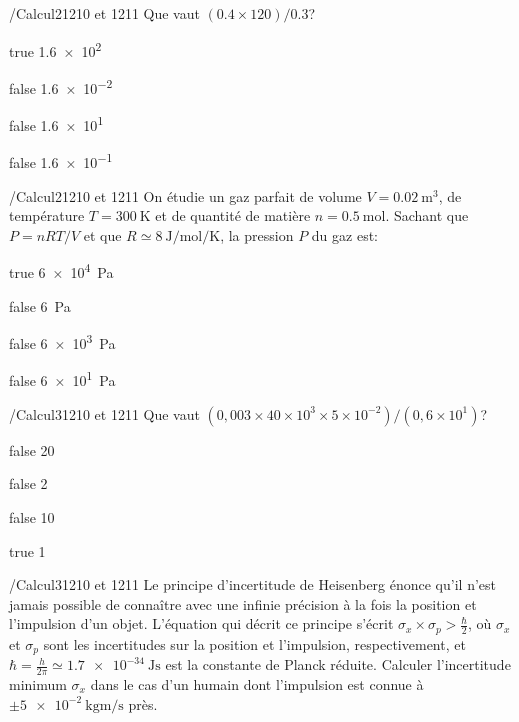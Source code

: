             \begin{question}{/}{Calcul}{2}{1210 et 1211}
                Que vaut $(\num{0.4} \times 120)/\num{0.3}$?
            \end{question}
            \begin{reponses}
                \item[true] \num{1.6e2}
                \item[false] \num{1.6e-2}
                \item[false] \num{1.6e1}
                \item[false] \num{1.6e-1}
            \end{reponses}
            \begin{question}{/}{Calcul}{2}{1210 et 1211}
                On étudie un gaz parfait de volume $V=\SI{0.02}{\meter\cubed}$, de température $T=\SI{300}{\kelvin}$ et de quantité de matière $n=\SI{0.5}{\mole}$. Sachant que $P=nRT/V$ et que $R\simeq\SI{8}{\joule\per\mole\per\kelvin}$, la pression $P$ du gaz est:
            \end{question}
            \begin{reponses}
                \item[true] \SI{6e4}{\pascal}
                \item[false] \SI{6}{\pascal}
                \item[false] \SI{6e3}{\pascal}
                \item[false] \SI{6e1}{\pascal}
            \end{reponses}
        	\begin{question}{/}{Calcul}{3}{1210 et 1211}
				Que vaut $\left(0,003 \times 40 \times 10^3 \times 5 \times 10^{-2} \right)/\left(0,6 \times 10^{1} \right) $?
            \end{question}
            \begin{reponses}
            	\item[false] 20
            	\item[false] 2
                \item[false] 10
                \item[true] 1
            \end{reponses}
            \begin{question}{/}{Calcul}{3}{1210 et 1211}
                Le principe d'incertitude de Heisenberg énonce qu'il n'est jamais possible de connaître avec une infinie précision à la fois la position et l'impulsion d'un objet. L'équation qui décrit ce principe s'écrit $\sigma_x \times \sigma_p > \frac{\hbar}{2}$, où $\sigma_x$ et $\sigma_p$ sont les incertitudes sur la position et l'impulsion, respectivement, et $\hbar = \frac{h}{2\pi} \simeq \SI{1,7e-34}{\joule\second}$ est la constante de Planck réduite. Calculer l'incertitude minimum $\sigma_x$ dans le cas d'un humain dont l'impulsion est connue à $\pm \SI{5e-2}{\kilo\gram\meter\per\second}$ près.
            \end{question}
